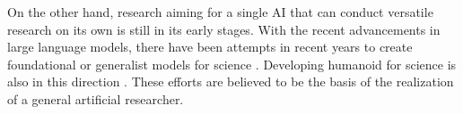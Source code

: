 On the other hand, research aiming for a single AI that can conduct versatile research on its own is still in its early stages. With the recent advancements in large language models, there have been attempts in recent years to create foundational or generalist models for science \cite{tu2023towards,taylor2022galactica}. Developing humanoid for science  is also in this direction \cite{yachie2017robotic}. These efforts are believed to be the basis of the realization of a general artificial researcher.






